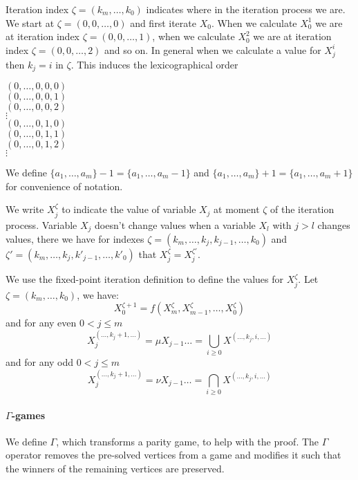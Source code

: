 Iteration index $\zeta = (k_m,\dots,k_0)$ indicates where in the iteration process we are. We start at $\zeta = (0,0,\dots,0)$ and first iterate $X_0$. When we calculate $X_0^1$ we are at iteration index $\zeta=(0,0,\dots,1)$, when we calculate $X_0^2$ we are at iteration index $\zeta=(0,0,\dots,2)$ and so on. In general when we calculate a value for $X_j^i$ then $k_j = i$ in $\zeta$. This induces the lexicographical order 
\begin{center}
	$(0,\dots,0,0,0)$\\
	$(0,\dots,0,0,1)$\\
	$(0,\dots,0,0,2)$\\
	$\vdots$\\
	$(0,\dots,0,1,0)$\\
	$(0,\dots,0,1,1)$\\
	$(0,\dots,0,1,2)$\\
	$\vdots$
\end{center}
We define $\{a_1,\dots,a_m\} -1 = \{a_1,\dots,a_m-1\}$ and $\{a_1,\dots,a_m\} + 1 = \{a_1,\dots,a_m+1\}$ for convenience of notation.

We write $X_j^\zeta$ to indicate the value of variable $X_j$ at moment $\zeta$ of the iteration process. Variable $X_j$ doesn't change values when a variable $X_l$ with $j>l$ changes values, there we have for indexes $\zeta = (k_m,\dots,k_j,k_{j-1},\dots,k_0)$ and $\zeta' = (k_m,\dots,k_j,k'_{j-1},\dots,k'_0)$ that $X_j^\zeta = X_j^{\zeta'}$.

We use the fixed-point iteration definition to define the values for $X_j^\zeta$. Let  $\zeta= (k_m,\dots,k_0)$, we have:
\[ X_0^{\zeta+1} = f(X_m^\zeta, X_{m-1}^\zeta,\dots,X_0^\zeta) \]
and for any even $0 < j \leq m$
\[ X_j^{(\dots,k_j+1,\dots)} = \mu X_{j-1}\dots = \bigcup_{i \geq 0}X^{(\dots,k_j,i,\dots)} \]
and for any odd $0 < j \leq m$
\[ X_j^{(\dots,k_j+1,\dots)} = \nu X_{j-1}\dots = \bigcap_{i \geq 0}X^{(\dots,k_j,i,\dots)} \]

\paragraph{$\Gamma$-games} 

We define $\Gamma$, which transforms a parity game, to help with the proof. The $\Gamma$ operator removes the pre-solved vertices from a game and modifies it such that the winners of the remaining vertices are preserved.

